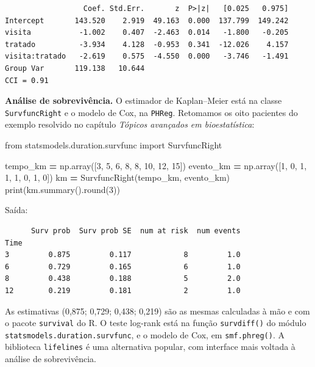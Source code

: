 \documentclass[
]{book}
\newenvironment{Shaded}{\begin{snugshade}}{\end{snugshade}}
\newcommand{\BuiltInTok}[1]{#1}
\newcommand{\DecValTok}[1]{\textcolor[rgb]{0.00,0.00,0.81}{#1}}
\newcommand{\ImportTok}[1]{#1}
\newcommand{\NormalTok}[1]{#1}
\newcommand{\OperatorTok}[1]{\textcolor[rgb]{0.81,0.36,0.00}{\textbf{#1}}}
\begin{document}
\begin{verbatim}
                  Coef. Std.Err.       z  P>|z|   [0.025   0.975]
Intercept       143.520    2.919  49.163  0.000  137.799  149.242
visita           -1.002    0.407  -2.463  0.014   -1.800   -0.205
tratado          -3.934    4.128  -0.953  0.341  -12.026    4.157
visita:tratado   -2.619    0.575  -4.550  0.000   -3.746   -1.491
Group Var       119.138   10.644                                 
CCI = 0.91
\end{verbatim}

\textbf{Análise de sobrevivência.} O estimador de Kaplan--Meier está na classe \texttt{SurvfuncRight} e o modelo de Cox, na \texttt{PHReg}. Retomamos os oito pacientes do exemplo resolvido no capítulo \emph{Tópicos avançados em bioestatística}:

\begin{Shaded}
\begin{Highlighting}[]
\ImportTok{from}\NormalTok{ statsmodels.duration.survfunc }\ImportTok{import}\NormalTok{ SurvfuncRight}

\NormalTok{tempo\_km }\OperatorTok{=}\NormalTok{ np.array([}\DecValTok{3}\NormalTok{, }\DecValTok{5}\NormalTok{, }\DecValTok{6}\NormalTok{, }\DecValTok{8}\NormalTok{, }\DecValTok{8}\NormalTok{, }\DecValTok{10}\NormalTok{, }\DecValTok{12}\NormalTok{, }\DecValTok{15}\NormalTok{])}
\NormalTok{evento\_km }\OperatorTok{=}\NormalTok{ np.array([}\DecValTok{1}\NormalTok{, }\DecValTok{0}\NormalTok{, }\DecValTok{1}\NormalTok{, }\DecValTok{1}\NormalTok{, }\DecValTok{1}\NormalTok{, }\DecValTok{0}\NormalTok{, }\DecValTok{1}\NormalTok{, }\DecValTok{0}\NormalTok{])}
\NormalTok{km }\OperatorTok{=}\NormalTok{ SurvfuncRight(tempo\_km, evento\_km)}
\BuiltInTok{print}\NormalTok{(km.summary().}\BuiltInTok{round}\NormalTok{(}\DecValTok{3}\NormalTok{))}
\end{Highlighting}
\end{Shaded}

Saída:

\begin{verbatim}
      Surv prob  Surv prob SE  num at risk  num events
Time                                                  
3         0.875         0.117            8         1.0
6         0.729         0.165            6         1.0
8         0.438         0.188            5         2.0
12        0.219         0.181            2         1.0
\end{verbatim}

As estimativas (0,875; 0,729; 0,438; 0,219) são as mesmas calculadas à mão e com o pacote \texttt{survival} do R. O teste log-rank está na função \texttt{survdiff()} do módulo \texttt{statsmodels.duration.survfunc}, e o modelo de Cox, em \texttt{smf.phreg()}. A biblioteca \texttt{lifelines} é uma alternativa popular, com interface mais voltada à análise de sobrevivência.
\end{document}
